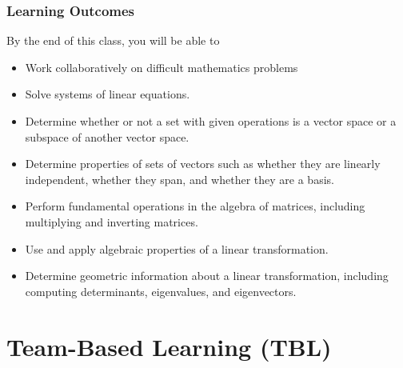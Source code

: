 \documentclass[aspectratio=1610]{beamer}
\begin{document}
\begin{frame} \frametitle{Learning Outcomes }
By the end of this class, you will be able to
\begin{itemize}
\item Work collaboratively on difficult mathematics problems
\pause \item Solve systems of linear equations.
\pause \item Determine whether or not a set with given operations is a vector space or a subspace of another vector space.
\pause \item Determine properties of sets of vectors such as whether they are linearly independent, whether they span, and whether they are a basis.
\pause \item Perform fundamental operations in the algebra of matrices, including multiplying and inverting matrices.
\pause \item Use and apply algebraic properties of a linear transformation.
\pause \item Determine geometric information about a linear transformation, including computing determinants, eigenvalues, and eigenvectors.
\end{itemize}
\end{frame}




  \section{Team-Based Learning (TBL)}

%
%
%  
%
%  
%  
  
\end{document}
